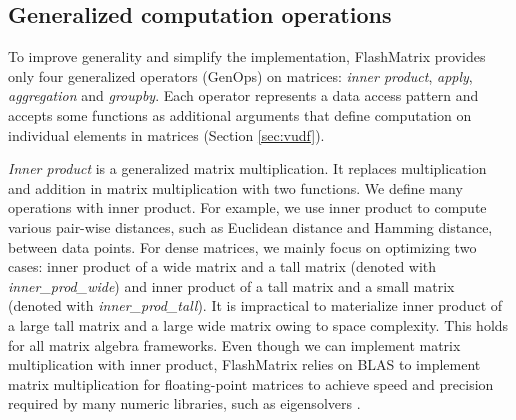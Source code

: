 


\subsection{Generalized computation operations} \label{sec:genop}
To improve generality and simplify the implementation, FlashMatrix provides
only four generalized operators (GenOps) on matrices: \textit{inner product},
\textit{apply}, \textit{aggregation} and \textit{groupby}. Each operator
represents a data access pattern and accepts some functions as additional
arguments that define computation
on individual elements in matrices (Section \ref{sec:vudf}).

\textit{Inner product} is a generalized matrix multiplication. It replaces
multiplication and addition in matrix multiplication with two functions.
We define many operations with inner product. For example, we use inner product
to compute various pair-wise distances, such as Euclidean distance and Hamming
distance, between data points. For dense matrices, we mainly focus on
optimizing two cases: inner product of a wide matrix and a tall matrix (denoted
with \textit{inner\_prod\_wide}) and inner product of a tall matrix and a small
matrix (denoted with \textit{inner\_prod\_tall}). It is impractical to
materialize inner product of a large tall matrix and a large wide matrix owing
to space complexity. This holds for all matrix algebra frameworks.
Even though we can implement matrix multiplication with inner product,
FlashMatrix relies on BLAS to implement matrix multiplication for
floating-point matrices to achieve speed and precision required by
many numeric libraries, such as eigensolvers \cite{anasazi, FlashEigen}.

